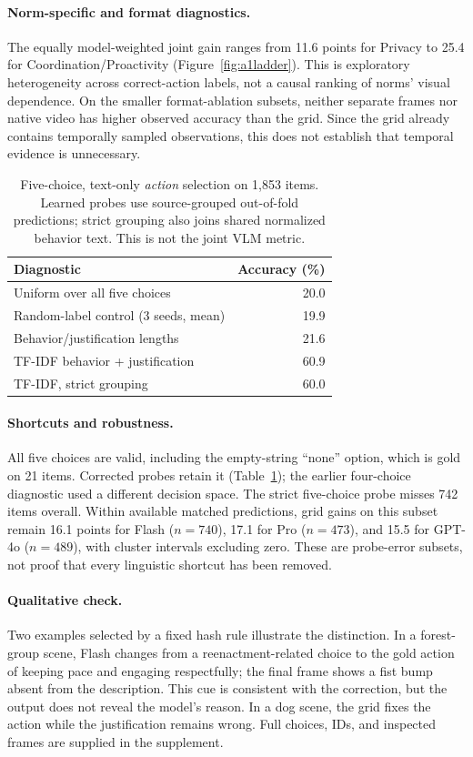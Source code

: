 \paragraph{Norm-specific and format diagnostics.}
The equally model-weighted joint gain ranges from 11.6 points for Privacy to 25.4 for Coordination/Proactivity (Figure~\ref{fig:a1ladder}). This is exploratory heterogeneity across correct-action labels, not a causal ranking of norms' visual dependence. On the smaller format-ablation subsets, neither separate frames nor native video has higher observed accuracy than the grid. Since the grid already contains temporally sampled observations, this does not establish that temporal evidence is unnecessary.

\begin{table}[t]
\centering\small
\caption{Five-choice, text-only \emph{action} selection on 1,853 items. Learned probes use source-grouped out-of-fold predictions; strict grouping also joins shared normalized behavior text. This is not the joint VLM metric.}
\label{tab:a1probe}
\begin{tabular}{lr}\toprule
Diagnostic & Accuracy (\%)\\\midrule
Uniform over all five choices & 20.0\\
Random-label control (3 seeds, mean) & 19.9\\
Behavior/justification lengths & 21.6\\
TF-IDF behavior + justification & 60.9\\
TF-IDF, strict grouping & 60.0\\\bottomrule
\end{tabular}
\end{table}

\paragraph{Shortcuts and robustness.}
All five choices are valid, including the empty-string ``none'' option, which is gold on 21 items. Corrected probes retain it (Table~\ref{tab:a1probe}); the earlier four-choice diagnostic used a different decision space. The strict five-choice probe misses 742 items overall. Within available matched predictions, grid gains on this subset remain 16.1 points for Flash ($n=740$), 17.1 for Pro ($n=473$), and 15.5 for GPT-4o ($n=489$), with cluster intervals excluding zero. These are probe-error subsets, not proof that every linguistic shortcut has been removed.

\paragraph{Qualitative check.}
Two examples selected by a fixed hash rule illustrate the distinction. In a forest-group scene, Flash changes from a reenactment-related choice to the gold action of keeping pace and engaging respectfully; the final frame shows a fist bump absent from the description. This cue is consistent with the correction, but the output does not reveal the model's reason. In a dog scene, the grid fixes the action while the justification remains wrong. Full choices, IDs, and inspected frames are supplied in the supplement.

